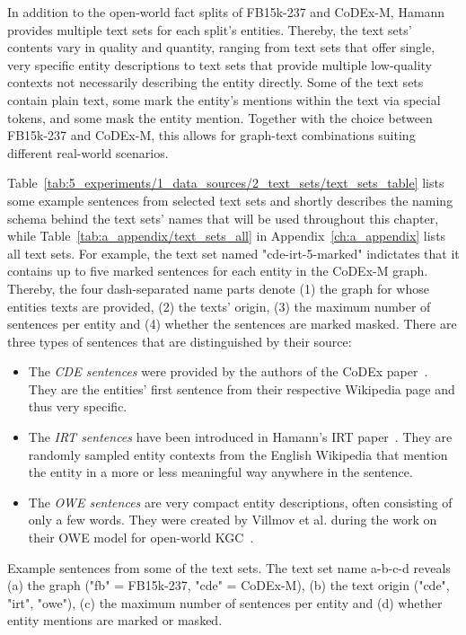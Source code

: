 In addition to the open-world fact splits of FB15k-237 and CoDEx-M, Hamann provides multiple text sets for each split's entities. Thereby, the text sets' contents vary in quality and quantity, ranging from text sets that offer single, very specific entity descriptions to text sets that provide multiple low-quality contexts not necessarily describing the entity directly. Some of the text sets contain plain text, some mark the entity's mentions within the text via special tokens, and some mask the entity mention. Together with the choice between FB15k-237 and CoDEx-M, this allows for graph-text combinations suiting different real-world scenarios.

Table~\ref{tab:5_experiments/1_data_sources/2_text_sets/text_sets_table} lists some example sentences from selected text sets and shortly describes the naming schema behind the text sets' names that will be used throughout this chapter, while Table~\ref{tab:a_appendix/text_sets_all} in Appendix~\ref{ch:a_appendix} lists all text sets. For example, the text set named "cde-irt-5-marked" indictates that it contains up to five marked sentences for each entity in the CoDEx-M graph. Thereby, the four dash-separated name parts denote (1) the graph for whose entities texts are provided, (2) the texts' origin, (3) the maximum number of sentences per entity and (4) whether the sentences are marked masked. There are three types of sentences that are distinguished by their source:

\begin{itemize}
    \item The \emph{CDE sentences} were provided by the authors of the CoDEx paper~\cite{}. They are the entities' first sentence from their respective Wikipedia page and thus very specific.
    \item The \emph{IRT sentences} have been introduced in Hamann's IRT paper~\cite{}. They are randomly sampled entity contexts from the English Wikipedia that mention the entity in a more or less meaningful way anywhere in the sentence.
    \item The \emph{OWE sentences} are very compact entity descriptions, often consisting of only a few words. They were created by Villmov et al. during the work on their OWE model for open-world KGC~\cite{Shah2019AnOE}.
\end{itemize}

\begin{table}
    \centering
    
    \caption{Example sentences from some of the text sets. The text set name a-b-c-d reveals (a) the graph ("fb" = FB15k-237, "cde" = CoDEx-M), (b) the text origin ("cde", "irt", "owe"), (c) the maximum number of sentences per entity and (d) whether entity mentions are marked or masked.}
    \label{tab:5_experiments/1_data_sources/2_text_sets/text_sets_table}
\end{table}
